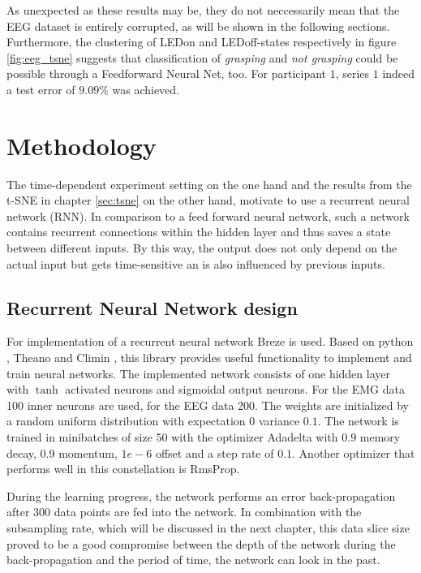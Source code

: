 \documentclass{article} %
\begin{document}
As unexpected as these results may be, they do not neccessarily mean that the EEG dataset is entirely corrupted, as will be shown in the following sections. Furthermore, the clustering of LEDon and LEDoff-states respectively in figure \ref{fig:eeg_tsne} suggests that classification of \emph{grasping} and \emph{not grasping} could be possible through a Feedforward Neural Net, too. For participant $1$, series $1$ indeed a test error of $9.09\%$ was achieved.

\section{Methodology}
The time-dependent experiment setting on the one hand and the results from the t-SNE in chapter \ref{sec:tsne} on the other hand, motivate to use a recurrent neural network (RNN).
In comparison to a feed forward neural network, such a network contains recurrent connections within the hidden layer and thus saves a state between different inputs.
By this way, the output does not only depend on the actual input but gets time-sensitive an is also influenced by previous inputs.

\subsection{Recurrent Neural Network design}
For implementation of a recurrent neural network Breze \cite{breze} is used.
Based on python \cite{python}, Theano \cite{theano} and Climin \cite{climin}, this library provides useful functionality to implement and train neural networks.
The implemented network consists of one hidden layer with $\tanh$ activated neurons and sigmoidal output neurons.
For the EMG data 100 inner neurons are used, for the EEG data 200.
The weights are initialized by a random uniform distribution with expectation $0$ variance $0.1$.
The network is trained in minibatches of size 50 with the optimizer Adadelta with $0.9$ memory decay, $0.9$ momentum, $1e-6$ offset and a step rate of $0.1$.
Another optimizer that performs well in this constellation is RmsProp.

During the learning progress, the network performs an error back-propagation after $300$ data points are fed into the network.
In combination with the subsampling rate, which will be discussed in the next chapter, this data slice size proved to be a good compromise between the depth of the network during the back-propagation and the period of time, the network can look in the past.
\end{document}
